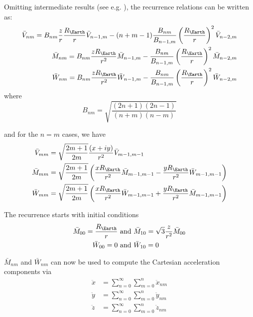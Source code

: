 Omitting intermediate results (see e.g. \cite{Atallah2022}), the recurrence relations 
can be written as:
\begin{equation}
  \begin{aligned}
    \bar{V}_{nm} = B_{nm} \frac{z}{r} \frac{R_{\Earth}}{r} \bar{V}_{n-1,m} 
      - (n+m-1) \frac{B_{nm}}{B_{n-1,m}} \left( \frac{R_{\Earth}}{r} \right) ^2 \bar{V}_{n-2,m} \\
    \bar{M}_{nm} = B_{nm} \frac{zR_{\Earth}}{r^2} \bar{M}_{n-1,m} 
      - \frac{B_{nm}}{B_{n-1,m}} \left( \frac{R_{\Earth}}{r} \right) ^2 \bar{M}_{n-2,m} \\
    \bar{W}_{nm} = B_{nm} \frac{zR_{\Earth}}{r^2} \bar{W}_{n-1,m} 
      - \frac{B_{nm}}{B_{n-1,m}} \left( \frac{R_{\Earth}}{r} \right) ^2 \bar{W}_{n-2,m}
  \end{aligned}
\end{equation}
where 
\begin{equation}
  B_{nm} = \sqrt{\frac{(2n+1)(2n-1)}{(n+m)(n-m)}}
\end{equation}

and for the $n=m$ cases, we have
\begin{equation}
  \begin{aligned}
    \bar{V}_{mm} &= \sqrt{\frac{2m+1}{2m}} \frac{\left(x+iy\right)}{r^2} \bar{V}_{m-1,m-1} \\
    \bar{M}_{mm} &= \sqrt{\frac{2m+1}{2m}} \left( \frac{xR_{\Earth}}{r^2} \bar{M}_{m-1,m-1} 
      - \frac{yR_{\Earth}}{r^2} \bar{W}_{m-1,m-1} \right) \\
    \bar{W}_{mm} &= \sqrt{\frac{2m+1}{2m}} \left( \frac{xR_{\Earth}}{r^2} \bar{W}_{m-1,m-1} 
      + \frac{yR_{\Earth}}{r^2} \bar{M}_{m-1,m-1} \right) \\
  \end{aligned}
\end{equation}

The recurrence starts with initial conditions
\begin{equation}
  \begin{aligned}
    \bar{M}_{00} = \frac{R_{\Earth}}{r} &\text{ and } 
      \bar{M}_{10} = \sqrt{3} \frac{z}{r^2} \bar{M}_{00} \\
    \bar{W}_{00} = 0 &\text{ and } \bar{W}_{10} = 0
  \end{aligned}
\end{equation}

$\bar{M}_{nm}$ and $\bar{W}_{nm}$ can now be used to compute the Cartesian acceleration 
components via
\begin{equation}
  \begin{aligned}
    \ddot{x} & = \sum_{n=0}^{\infty} \sum_{m=0}^{n} \ddot{x}_{nm} \\
    \ddot{y} & = \sum_{n=0}^{\infty} \sum_{m=0}^{n} \ddot{y}_{nm} \\
    \ddot{z} & = \sum_{n=0}^{\infty} \sum_{m=0}^{n} \ddot{z}_{nm}
  \end{aligned}
\end{equation}

